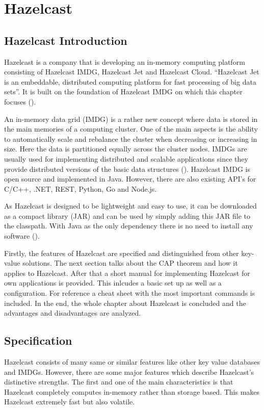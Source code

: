 
\chapter{Hazelcast}

\section{Hazelcast Introduction}

Hazelcast is a company that is developing an in-memory computing platform consisting of Hazelcast IMDG, Hazelcast Jet and Hazelcast Cloud. “Hazelcast Jet is an embeddable, distributed computing platform for fast processing of big data sets”. It is built on the foundation of Hazelcast IMDG on which this chapter focuses (\cite{hazelcast}).

An in-memory data grid (IMDG) is a rather new concept where data is stored in the main memories of a computing cluster. One of the main aspects is the ability to automatically scale and rebalance the cluster when decreasing or increasing in size. Here the data is partitioned equally across the cluster nodes. IMDGs are usually used for implementing distributed and scalable applications since they provide distributed versions of the basic data structures (\cite{tasci2015}). Hazelcast IMDG is open source and implemented in Java. However, there are also existing API’s for C/C++, .NET, REST, Python, Go and Node.js.

As Hazelcast is designed to be lightweight and easy to use, it can be downloaded as a compact library (JAR) and can be used by simply adding this JAR file to the classpath. With Java as the only dependency there is no need to install any software (\cite{hazelcastmanual}).

Firstly, the features of Hazelcast are specified and distinguished from other key-value solutions. The next section talks about the CAP theorem and how it applies to Hazelcast. After that a short manual for implementing Hazelcast for own applications is provided. This inlcudes a basic set up as well as a configuration. For reference a cheat sheet with the most important commands is included. In the end, the whole chapter about Hazelcast is concluded and the advantages and disadvantages are analyzed. 
\section{Specification}
Hazelcast consists of many same or similar features like other key value databases and IMDGs. However, there are some major features which describe Hazelcast’s distinctive strengths.
The first and one of the main characteristics is that Hazelcast completely computes in-memory rather than storage based.  This makes Hazelcast extremely fast but also volatile.

